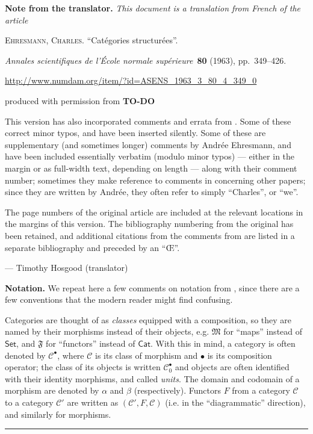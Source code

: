 \documentclass[a4paper,oneside,nobib,nofonts,notitlepage,notoc,nols,fleqn,justified]{tufte-book}
\title{\sc{Structured categories}}
\author{Charles Ehresmann}
\date{1963}
\newcommand{\origcit}{%
  \textsc{Ehresmann, Charles.}
  ``Catégories structurées''.
  \par\emph{Annales scientifiques de l'École normale supérieure}~\textbf{80} (1963), pp.~349--426.
  \par\url{http://www.numdam.org/item/?id=ASENS_1963_3_80_4_349_0}
}
\newenvironment{translator}[1]
  {\phantomsection\par\medskip\noindent\small\textbf{#1.}\itshape}
  {\par\medskip}
\newenvironment{rmenv}[1]
  {\phantomsection\par\medskip\noindent\textbf{#1.}\rmfamily}
  {\par\medskip}
\newcommand{\todo}{{\color{purple}\textbf{TO-DO }}}
\newcommand{\CC}{\mathcal{C}}
\newcommand{\MM}{\mathfrak{M}}
\newcommand{\FF}{\mathfrak{F}}
\begin{document}
\maketitle

\begin{fullwidth}
  \begin{translator}{Note from the translator}
    This document is a translation from French of the article

    \medskip
    {\normalfont\origcit}

    \medskip
    produced with permission from \todo

    This version has also incorporated comments and errata from \cite[Comments on Part III-1, p.~342--363]{coll}.
    Some of these correct minor typos, and have been inserted silently.
    Some of these are supplementary (and sometimes longer) comments by Andrée Ehresmann, and have been included essentially verbatim (modulo minor typos) --- either in the margin or as full-width text, depending on length --- along with their comment number;
    sometimes they make reference to comments in \cite[Comments on Part III-1]{coll} concerning other papers;
    since they are written by Andrée, they often refer to simply ``Charles'', or ``we''.

    The page numbers of the original article are included at the relevant locations in the margins of this version.
    The bibliography numbering from the original has been retained, and additional citations from the comments from \cite{coll} are listed in a separate bibliography and preceded by an ``Œ''.
  
    \hfill--- Timothy Hosgood (translator)
  \end{translator}

  \begin{rmenv}{Notation}
    We repeat here a few comments on notation from \cite[Comments on Part III-1, p.~337--338]{coll}, since there are a few conventions that the modern reader might find confusing.

    Categories are thought of as \emph{classes} equipped with a composition, so they are named by their morphisms instead of their objects, e.g. $\MM$ for ``maps'' instead of $\mathsf{Set}$, and $\FF$ for ``functors'' instead of $\mathsf{Cat}$.
    With this in mind, a category is often denoted by $\CC^\bullet$, where $\CC$ is its class of morphism and $\bullet$ is its composition operator; the class of its objects is written $\CC_0^\bullet$ and objects are often identified with their identity morphisms, and called \emph{units}.
    The domain and codomain of a morphism are denoted by $\alpha$ and $\beta$ (respectively).
    Functors $F$ from a category $\CC$ to a category $\CC'$ are written as $(\CC',F,\CC)$ (i.e. in the ``diagrammatic'' direction), and similarly for morphisms.
  \end{rmenv}

  \bigskip
  \hrule
  \bigskip
\end{fullwidth}
\end{document}
